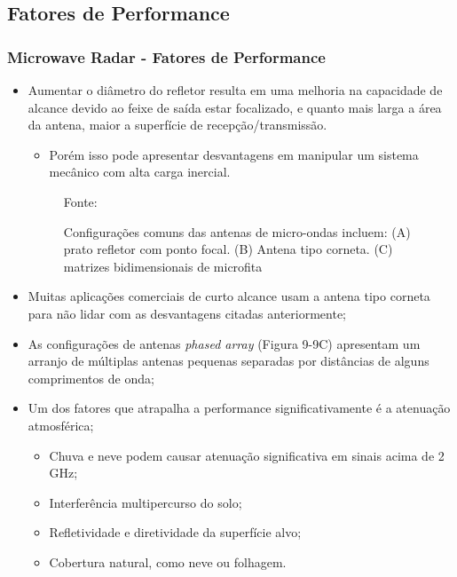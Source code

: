 \documentclass[xcolor=dvipsnames, aspectratio=169]{beamer}
\begin{document}
    \subsection[Fatores de Performance]{Fatores de Performance} 
    \begin{frame}
    \frametitle{Microwave Radar - Fatores de Performance}
        \begin{itemize}
            \item Aumentar o diâmetro do refletor resulta em uma melhoria na capacidade de alcance devido ao feixe de saída estar focalizado, e quanto mais larga a área da antena, maior a superfície de recepção/transmissão.
            \begin{itemize}
                \item Porém isso pode apresentar desvantagens em manipular um sistema mecânico com alta carga inercial.
            \end{itemize}
            		
		\begin{figure}
            \centering
            {Fonte: \cite{everett1995sensors}}
            \caption{Configurações comuns das antenas de micro-ondas incluem: (A) prato refletor com ponto focal. (B) Antena tipo corneta. (C) matrizes bidimensionais de microfita}
            \label{fig:MR_commom_config}
        \end{figure}
        
            \item Muitas aplicações comerciais de curto alcance usam a antena tipo corneta para não lidar com as desvantagens citadas anteriormente;
            \item As configurações de antenas \textit{phased array} (Figura 9-9C) apresentam um arranjo de múltiplas antenas pequenas separadas por distâncias de alguns comprimentos de onda;
            \item Um dos fatores que atrapalha a performance significativamente é a atenuação atmosférica;
            \begin{itemize}
                \item Chuva e neve podem causar atenuação significativa em sinais acima de 2 GHz;
                \item Interferência multipercurso do solo; 
                \item Refletividade e diretividade da superfície alvo;
                \item Cobertura natural, como neve ou folhagem.
            \end{itemize}
        \end{itemize}
    \end{frame}
\end{document}
